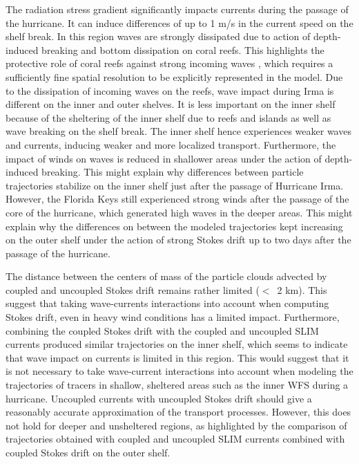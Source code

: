 \documentclass[preprint,12pt,authoryear]{elsarticle}
\begin{document}
The radiation stress gradient significantly impacts currents during the passage of the hurricane. It can induce differences of up to 1 m/s in the current speed on the shelf break. In this region waves are strongly dissipated due to action of depth-induced breaking and bottom dissipation on coral reefs. This highlights the protective role of coral reefs against strong incoming waves \citep{lowe2005spectral}, which requires a sufficiently fine spatial resolution to be  explicitly represented in the model. Due to the dissipation of incoming waves on the reefs, wave impact during Irma is different on the inner and outer shelves. It is less important on the inner shelf because of the sheltering of the inner shelf due to reefs and islands as well as wave breaking on the shelf break. The inner shelf hence experiences weaker waves and currents, inducing weaker and more localized transport. Furthermore, the impact of winds on waves is reduced in shallower areas under the action of depth-induced breaking. This might explain why differences between particle trajectories stabilize on the inner shelf just after the passage of Hurricane Irma. However, the Florida Keys still experienced strong winds after the passage of the core of the hurricane, which generated high waves in the deeper areas. This might explain why the differences on between the modeled trajectories kept increasing on the outer shelf under the action of strong Stokes drift up to two days after the passage of the hurricane.

The distance between the centers of mass of the particle clouds advected by coupled and uncoupled Stokes drift remains rather limited ($<$~2 km). This suggest that taking wave-currents interactions into account when computing Stokes drift, even in heavy wind conditions has a limited impact. Furthermore, combining the coupled Stokes drift with the coupled and uncoupled SLIM currents produced similar trajectories on the inner shelf, which seems to indicate that wave impact on currents is limited in this region. This would suggest that it is not necessary to take wave-current interactions into account when modeling the trajectories of tracers in shallow, sheltered areas such as the inner WFS during a hurricane. Uncoupled currents with uncoupled Stokes drift should give a reasonably accurate approximation of the transport processes. However, this does not hold for deeper and unsheltered regions, as highlighted by the comparison of trajectories obtained with coupled and uncoupled SLIM currents combined with coupled Stokes drift on the outer shelf.
\end{document}
